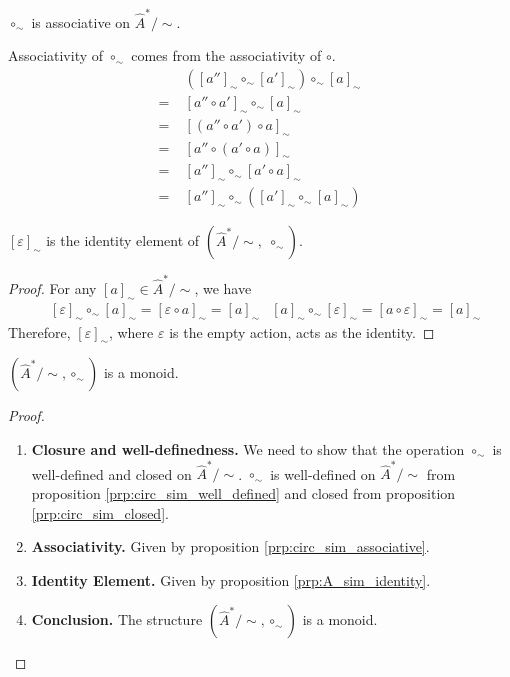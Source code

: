 \begin{propositionE}\label{prp:circ_sim_associative}
	$\circ_{\sim}$ is associative on $\hat{A}^{\ast}/\sim$.
\end{propositionE}
\begin{proofE}
	Associativity of $\circ_{\sim}$ comes from the associativity of $\circ$.
	\begin{align}
		     & ([a'']_{\sim} \circ_{\sim} [a']_{\sim}) \circ_{\sim} [a]_{\sim} \\
		= \; & [a'' \circ a']_{\sim} \circ_{\sim} [a]_{\sim}                   \\
		= \; & [ (a'' \circ a') \circ a ]_{\sim}                               \\
		= \; & [ a'' \circ (a' \circ a) ]_{\sim}                               \\
		= \; & [a'']_{\sim} \circ_{\sim} [a' \circ a]_{\sim}                   \\
		= \; & [a'']_{\sim} \circ_{\sim} ([a']_{\sim} \circ_{\sim} [a]_{\sim})
	\end{align}
\end{proofE}


\begin{proposition}\label{prp:A_sim_identity}
	$[\varepsilon]_{\sim}$ is the identity element of $(\hat{A}^{\ast}/\sim, \; \circ_{\sim})$.
\end{proposition}
\begin{proof}
	For any $[a]_{\sim} \in \hat{A}^{\ast}/\sim$, we have
	\begin{align}
		 & [\varepsilon]_{\sim} \circ_{\sim} [a]_{\sim} = [\varepsilon \circ a]_{\sim} = [a]_{\sim}
		 & [a]_{\sim} \circ_{\sim} [\varepsilon]_{\sim} = [a \circ \varepsilon]_{\sim} = [a]_{\sim}
	\end{align}
	Therefore, $[\varepsilon]_{\sim}$, where $\varepsilon$ is the empty action, acts as the identity.
\end{proof}


\begin{proposition}\label{prp:A_sim_is_monoid}
	$(\hat{A}^{\ast}/\sim, \circ_{\sim})$ is a monoid.
\end{proposition}
\begin{proof}
	\begin{enumerate}
		\item \textbf{Closure and well-definedness.}
		      We need to show that the operation $\circ_{\sim}$ is well-defined and closed on $\hat{A}^{\ast}/\sim$.
		      $\circ_{\sim}$ is well-defined on $\hat{A}^{\ast}/\sim$ from proposition \ref{prp:circ_sim_well_defined} and closed from proposition \ref{prp:circ_sim_closed}.

		\item \textbf{Associativity.}
		      Given by proposition \ref{prp:circ_sim_associative}.

		\item \textbf{Identity Element.}
		      Given by proposition \ref{prp:A_sim_identity}.

		\item \textbf{Conclusion.}
		      The structure $(\hat{A}^{\ast}/\sim, \circ_{\sim})$ is a monoid.
	\end{enumerate}
\end{proof}


